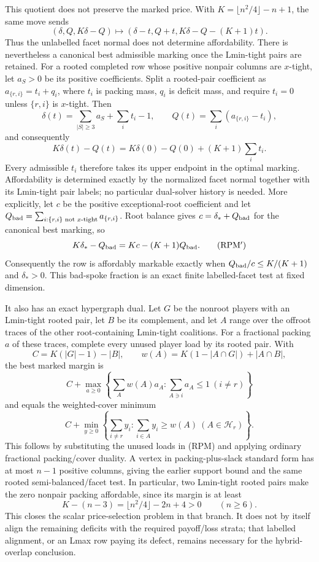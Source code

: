 \documentclass[11pt]{article}
\begin{document}
This quotient does not preserve the marked price.  With
$K=\lfloor n^2/4\rfloor-n+1$, the same move sends
\[
 (\delta,Q,K\delta-Q)
 \longmapsto(\delta-t,Q+t,K\delta-Q-(K+1)t).          \tag{RPGP}
\]
Thus the unlabelled facet normal does not determine affordability.  There is
nevertheless a canonical best admissible marking once the Lmin-tight pairs
are retained.  For a rooted completed row whose positive nonpair columns are
$x$-tight, let $a_S>0$ be its positive coefficients.  Split a
rooted-pair coefficient as $a_{\{r,i\}}=t_i+q_i$, where $t_i$ is packing
mass, $q_i$ is deficit mass, and require $t_i=0$ unless $\{r,i\}$ is
$x$-tight.  Then
\[
 \delta(t)=\sum_{|S|\ge3}a_S+\sum_i t_i-1,
 \qquad Q(t)=\sum_i(a_{\{r,i\}}-t_i),
\]
and consequently
\[
 K\delta(t)-Q(t)=K\delta(0)-Q(0)+(K+1)\sum_i t_i.    \tag{RPM}
\]
Every admissible $t_i$ therefore takes its upper endpoint in the optimal
marking.  Affordability is determined exactly by the normalized facet normal
together with its Lmin-tight pair labels; no particular dual-solver history
is needed.  More explicitly, let $c$ be the positive exceptional-root
coefficient and let
$Q_{\rm bad}=\sum_{i:\{r,i\}\text{ not }x\text{-tight}}a_{\{r,i\}}$.
Root balance gives $c=\delta_*+Q_{\rm bad}$ for the canonical best marking,
so
\[
 K\delta_*-Q_{\rm bad}=Kc-(K+1)Q_{\rm bad}.           \tag{RPM$'$}
\]
Consequently the row is affordably markable exactly when
$Q_{\rm bad}/c\le K/(K+1)$ and $\delta_*>0$.  This bad-spoke fraction is an
exact finite labelled-facet test at fixed dimension.

It also has an exact hypergraph dual.  Let $G$ be the nonroot players with
an Lmin-tight rooted pair, let $B$ be its complement, and let $A$ range over
the offroot traces of the other root-containing Lmin-tight coalitions.  For
a fractional packing $a$ of these traces, complete every unused player load
by its rooted pair.  With
\[
 C=K(|G|-1)-|B|,
 \qquad w(A)=K(1-|A\cap G|)+|A\cap B|,
\]
the best marked margin is
\[
 C+\max_{a\ge0}\left\{\sum_Aw(A)a_A:
              \sum_{A\ni i}a_A\le1\ (i\ne r)\right\}          \tag{LPC}
\]
and equals the weighted-cover minimum
\[
 C+\min_{y\ge0}\left\{\sum_{i\ne r}y_i:
              \sum_{i\in A}y_i\ge w(A)\ (A\in\mathcal H_r)\right\}.
                                                                    \tag{LCD}
\]
This follows by substituting the unused loads in (RPM) and applying ordinary
fractional packing/cover duality.  A vertex in packing-plus-slack standard
form has at most $n-1$ positive columns, giving the earlier support bound and
the same rooted semi-balanced/facet test.  In particular, two Lmin-tight
rooted pairs make the zero nonpair packing affordable, since its margin is at
least
\[
 K-(n-3)=\lfloor n^2/4\rfloor-2n+4>0\qquad(n\ge6).    \tag{LPC2}
\]
This closes the scalar price-selection problem in that branch.  It does not
by itself align the remaining deficits with the required payoff/loss strata;
that labelled alignment, or an Lmax row paying its defect, remains necessary
for the hybrid-overlap conclusion.
\end{document}
